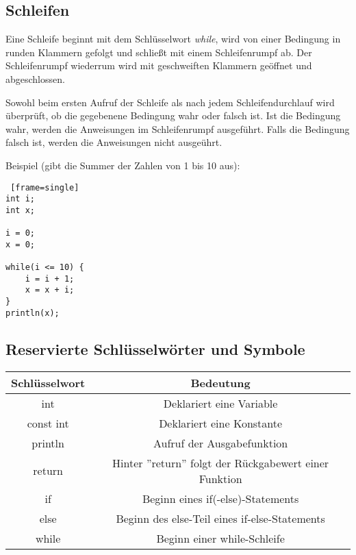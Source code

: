 \subsection{Schleifen}
Eine Schleife beginnt mit dem Schlüsselwort \textit{while}, wird von einer Bedingung in runden Klammern gefolgt und schließt mit einem Schleifenrumpf ab. Der Schleifenrumpf wiederrum wird mit geschweiften Klammern geöffnet und abgeschlossen.

Sowohl beim ersten Aufruf der Schleife als nach jedem Schleifendurchlauf wird überprüft, ob die gegebenene Bedingung wahr oder falsch ist. Ist die Bedingung wahr, werden die Anweisungen im Schleifenrumpf ausgeführt. Falls die Bedingung falsch ist, werden die Anweisungen nicht ausgeührt.

\pagebreak

Beispiel (gibt die Summer der Zahlen von 1 bis 10 aus):
\begin{lstlisting} [frame=single] 
int i;
int x;

i = 0;
x = 0;

while(i <= 10) {
	i = i + 1;
	x = x + i;
}
println(x);
\end{lstlisting}
	
\subsection{Reservierte Schlüsselwörter und Symbole}	

\begin{center}
  \begin{tabular}{ | c | c | }
    \hline
    Schlüsselwort & Bedeutung\\ \hline \hline
    int & Deklariert eine Variable\\ \hline
    const int & Deklariert eine Konstante\\ \hline
    println & Aufruf der Ausgabefunktion\\ \hline
    return & Hinter ''return'' folgt der Rückgabewert einer Funktion\\ \hline
    if & Beginn eines if(-else)-Statements\\ \hline
    else & Beginn des else-Teil eines if-else-Statements\\ \hline
    while & Beginn einer while-Schleife\\ \hline
    
  \end{tabular}
\end{center}


